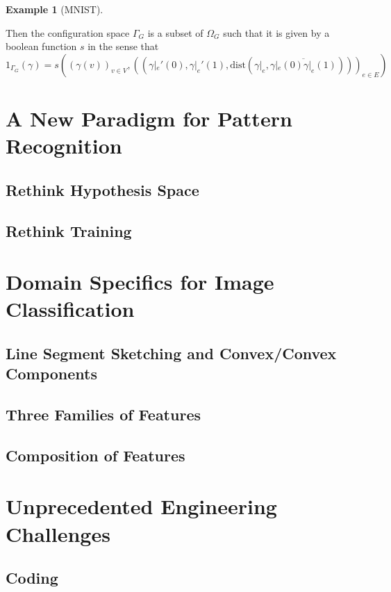 \documentclass[11pt]{article} 	%
\theoremstyle{definition}
\newtheorem*{example}{Example}
\begin{document}
\begin{example}[MNIST]
\begin{itemize}
Then the configuration space $\Gamma_G$ is a subset of $\Omega_G$ such that it is given by a boolean function $s$ in the sense that
\begin{equation}
	1_{\Gamma_G}(\gamma)=s((\gamma(v))_{v\in V},((\gamma|_e'(0), \gamma|_e'(1), \text{dist}(\gamma|_e,\overline{\gamma|_e(0)\gamma|_e(1)})))_{e\in E})
\end{equation}
\end{itemize}
\end{example}

\section{A New Paradigm for Pattern Recognition }
\subsection{Rethink Hypothesis Space}

\subsection{Rethink Training}

\section{Domain Specifics for Image Classification}

\subsection{Line Segment Sketching and Convex/Convex Components}

\subsection{Three Families of Features}

\subsection{Composition of Features}



\section{Unprecedented Engineering Challenges}

\subsection{Coding}
\end{document}
